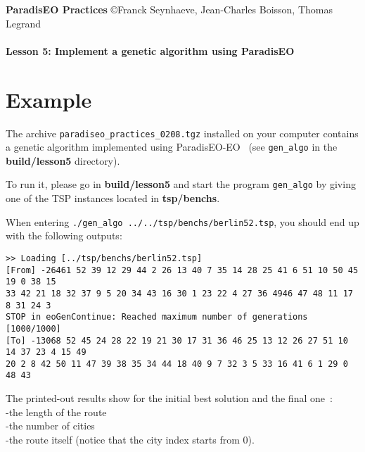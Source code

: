 \documentclass[a4paper]{article}
\begin{document}
\textbf{ParadisEO Practices}  {\copyright Franck Seynhaeve,
Jean-Charles Boisson, Thomas Legrand} \Large{\textbf{\\\\
Lesson 5: Implement a genetic algorithm using ParadisEO}}

\normalsize

 \vspace{-0,3cm}

\section{Example}

    The archive {\tt paradiseo\_practices\_0208.tgz} installed
    on your computer contains a genetic algorithm implemented using ParadisEO-EO~
    (see {\tt gen\_algo} in the {\bf build/lesson5} directory).

    \medskip
    To run it, please go in {\bf build/lesson5} and start the program {\tt gen\_algo} by giving
    one of the TSP instances located in {\bf tsp/benchs}.

    \medskip
    When entering {\tt ./gen\_algo ../../tsp/benchs/berlin52.tsp}, you should end up with the
    following outputs:

    \smallskip
    \noindent
    \texttt{>> Loading [../tsp/benchs/berlin52.tsp]}\\
    \texttt{[From] -26461  52 39 12 29 44 2 26 13 40 7 35 14 28 25 41 6 51 10 50 45 19 0 38 15}\\
    \texttt{33 42 21 18 32 37 9 5 20 34 43 16 30 1 23 22 4 27 36 4946 47 48 11 17 8 31 24 3}\\
    \texttt{STOP in eoGenContinue: Reached maximum number of generations [1000/1000]}\\
    \texttt{[To] -13068  52 45 24 28 22 19 21 30 17 31 36 46 25 13 12 26 27 51 10 14 37 23 4 15 49}\\
    \texttt{20 2 8 42 50 11 47 39 38 35 34 44 18 40 9 7 32 3 5 33 16 41 6 1 29 0 48
    43} \\

    \medskip

    The printed-out results show for the initial best solution and the final one~:
    \\ \hspace*{1cm}-the length of the route
    \\ \hspace*{1cm}-the number of cities
    \\ \hspace*{1cm}-the route itself (notice that the city index starts from 0).
\end{document}
